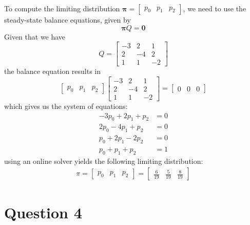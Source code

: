 \documentclass[12pt]{article}
\begin{document}
To compute the limiting distribution $\mathbf{\pi} = \begin{bmatrix}
    p_{0} & p_{1} & p_{2}
\end{bmatrix}$, we need to use the steady-state balance equations, given by \begin{equation}
    \mathbf{\pi} Q = \mathbf{0}
\end{equation} Given that we have \begin{equation}
    Q = \begin{bmatrix}
        -3 & 2 & 1 \\ 
        2 & -4 & 2 \\ 
        1 & 1 & -2
    \end{bmatrix}
\end{equation} the balance equation results in \begin{equation*}
    \begin{bmatrix}
        p_{0} & p_{1} & p_{2}
    \end{bmatrix} \begin{bmatrix}
        -3 & 2 & 1 \\ 
        2 & -4 & 2 \\ 
        1 & 1 & -2
    \end{bmatrix} = \begin{bmatrix}
        0 & 0 & 0
    \end{bmatrix}
\end{equation*} which gives us the system of equations: \begin{align*}
    -3 p_{0} + 2 p_{1} + p_{2} &= 0 \\ 
    2 p_{0} - 4 p_{1} + p_{2} &= 0 \\ 
    p_{0} + 2 p_1 - 2 p_{2} &= 0 \\ 
    p_{0} + p_{1} + p_{2} &= 1
\end{align*} using an online solver yields the following limiting distribution: \begin{align*}
    \pi = \begin{bmatrix}
        p_{0} & p_{1} & p_{2}
    \end{bmatrix} = \begin{bmatrix}
        \displaystyle \frac{6}{19} & \displaystyle \frac{5}{19} & \displaystyle \frac{8}{19}
    \end{bmatrix}
\end{align*}

\newpage

\section*{Question 4}
\end{document}
